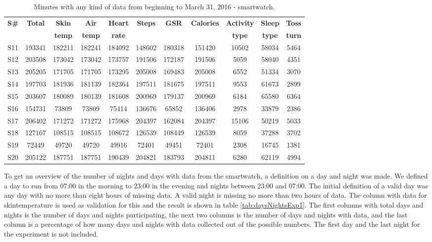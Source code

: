 \documentclass[12pt]{article} %
\begin{document}
\begin{table}[H]
\center
\begin{footnotesize}
	\begin{tabular}{| c | c || c | c | c | c | c | c | c | c | c |}
	\hline
	\textbf{S\#} & \textbf{Total} & \textbf{Skin} & \textbf{Air} & \textbf{Heart} & \textbf{Steps} & \textbf{GSR} & \textbf{Calories} & \textbf{Activity} & \textbf{Sleep} & \textbf{Toss}\\
	 & & \textbf{temp} & \textbf{temp} & \textbf{rate} & & & & \textbf{type} & \textbf{type} & \textbf{turn}\\
	
	\hline
	S11 & 193341 & 182211 & 182241 & 184092 & 148602 & 180318 & 151420 & 10502 & 58034 & 5464\\
	\hline
	S12 & 203508 & 173042 & 173042 & 173757 & 191506 & 172187 & 191506 & 5059 & 58040 & 4351 \\
	\hline
	S13 & 205205 & 171705 & 171705 & 173295 & 205008 & 169483 & 205008 & 6552 & 51334 & 3070\\
	\hline
	S14 & 197703 & 181936 & 181139 & 182364 & 197511 & 181675 & 197511 & 9553 & 61673 & 2899 \\
	\hline
	S15 & 203607 & 180089 & 180139 & 181608 & 200969 & 179137 & 200969 & 6184 & 65580 & 6364 \\
	\hline
	S16 & 154731 & 73809 & 73809 & 75414 &136676 & 65852 & 136406 & 2978 & 33879 & 2386\\
	\hline
	S17 & 206402 & 171272 & 171272 & 175968 & 204397 & 162084 & 204397 & 15106 & 50219 & 5033\\
	\hline
	S18 & 127167 & 108515 &108515 & 108672 & 126539 & 108449 & 126539 & 8059 & 37288 & 3702 \\
	\hline
	S19 & 72449 & 49720 & 49720 & 49916 & 72401 & 49451 & 72401 & 2308 & 16745 & 1381 \\
	\hline
	S20 & 205122 & 187751 & 187751 & 190439 & 204821 & 183793 & 204811 & 6280 & 62119 & 4994\\
	\hline
	\end{tabular}
	\caption{Minutes with any kind of data from beginning to March 31, 2016 - smartwatch.}
	\label{tab:totalMinutesWatch}
\end{footnotesize}
\end{table}

To get an overview of the number of nights and days with data from the smartwatch, a definition on a day and night was made. We defined a day to run from 07:00 in the morning to 23:00 in the evening and nights between 23:00 and 07:00. The initial definition of a valid day was any day with no more than eight hours of missing data. A valid night is missing no more than two hours of data. The column with data for skintemperature is used as validation for this and the result is shown in table \ref{tab:daysNightsExp1}. The first columns with total days and nights is the number of days and nights participating, the next two columns is the number of days and nights with data, and the last column is a percentage of how many days and nights with data collected out of the possible numbers. The first day and the last night for the experiment is not included. 
\end{document}
